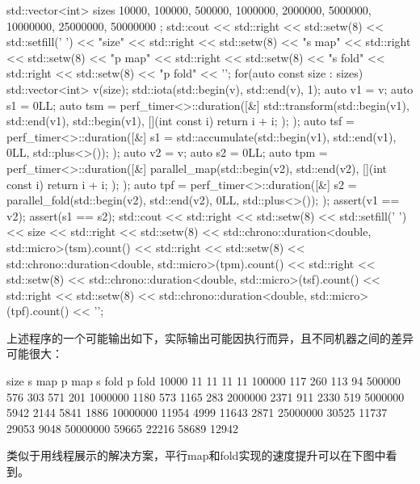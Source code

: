 \begin{cpp}
std::vector<int> sizes
{
    10000, 100000, 500000,
    1000000, 2000000, 5000000,
    10000000, 25000000, 50000000
};
std::cout
    << std::right << std::setw(8) << std::setfill(' ') << "size"
    << std::right << std::setw(8) << "s map"
    << std::right << std::setw(8) << "p map"
    << std::right << std::setw(8) << "s fold"
    << std::right << std::setw(8) << "p fold"
    << '\n';
for(auto const size : sizes)
{
    std::vector<int> v(size);
    std::iota(std::begin(v), std::end(v), 1);
    auto v1 = v;
    auto s1 = 0LL;
    auto tsm = perf_timer<>::duration([&] {
        std::transform(std::begin(v1), std::end(v1), std::begin(v1),
                       [](int const i) {return i + i; }); });
    auto tsf = perf_timer<>::duration([&] {
        s1 = std::accumulate(std::begin(v1), std::end(v1), 0LL,
                             std::plus<>()); });
    auto v2 = v;
    auto s2 = 0LL;
    auto tpm = perf_timer<>::duration([&] {
        parallel_map(std::begin(v2), std::end(v2),
                    [](int const i) {return i + i; }); });
    auto tpf = perf_timer<>::duration([&] {
        s2 = parallel_fold(std::begin(v2), std::end(v2), 0LL,
                            std::plus<>()); });
    assert(v1 == v2);
    assert(s1 == s2);
    std::cout
        << std::right << std::setw(8) << std::setfill(' ') << size
        << std::right << std::setw(8)
        << std::chrono::duration<double, std::micro>(tsm).count()
        << std::right << std::setw(8)
        << std::chrono::duration<double, std::micro>(tpm).count()
        << std::right << std::setw(8)
        << std::chrono::duration<double, std::micro>(tsf).count()
        << std::right << std::setw(8)
        << std::chrono::duration<double, std::micro>(tpf).count()
        << '\n';
}
\end{cpp}

上述程序的一个可能输出如下，实际输出可能因执行而异，且不同机器之间的差异可能很大：

\begin{shell}
    size   s map   p map  s fold  p fold
   10000      11      11      11      11
  100000     117     260     113      94
  500000     576     303     571     201
 1000000    1180     573    1165     283
 2000000    2371     911    2330     519
 5000000    5942    2144    5841    1886
10000000   11954    4999   11643    2871
25000000   30525   11737   29053    9048
50000000   59665   22216   58689   12942
\end{shell}

类似于用线程展示的解决方案，平行map和fold实现的速度提升可以在下图中看到。

